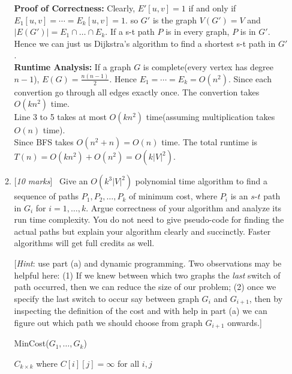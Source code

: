 \documentclass[11pt]{article}
\newcommand{\Q}[1]{\medskip\item {[{\em #1 marks\/}]}\ }
\begin{document}
\begin{enumerate}
\begin{enumerate}
\textbf{Proof of Correctness:} Clearly, $E'[u, v] = 1$ if and only if $E_1[u, v] = \cdots = E_k[u, v] = 1$.
so $G'$ is the graph $V(G') = V$ and $|E(G')| = E_1 \cap \dots \cap E_k$.
If a s-t path $P$ is in every graph, $P$ is in $G'$. Hence we can just us Dijkstra's algorithm to find a 
shortest s-t path in $G'$.\\
\textbf{Runtime Analysis:} If a graph $G$ is complete(every vertex has degree $n - 1$), $E(G) = \frac 
{n(n - 1)} {2}$. Hence $E_1 = \cdots = E_k = O(n^2)$. Since each convertion go through all edges exactly once. 
The convertion takes $O(k n^2)$ time. \\
Line 3 to 5 takes at most $O(kn^2)$ time(assuming multiplication takes $O(n)$ time). \\
Since BFS takes $O(n^2 + n) = O(n)$ time. The total runtime is 
$T(n) = O(kn^2) + O(n^2) = O(k |V|^2)$.

\newpage
	\Q{10} Give an $O(k^3|V|^2)$ polynomial time algorithm to find a sequence of paths $P_1, P_2, \ldots, P_k$ of minimum cost, where $P_i$ is an $s$-$t$ path in $G_i$ for $i=1,\ldots,k$. Argue correctness of your algorithm and analyze its run time complexity. You do not need to give pseudo-code for finding the actual paths but explain your algorithm clearly and succinctly. Faster algorithms will get full credits as well.
	
	[\emph{Hint}: use part (a) and dynamic programming. Two observations may be helpful here: (1) If we knew between which two graphs the \emph{last} switch of path occurred, then we can reduce the size of our problem; (2) once we specify the last switch to occur say between graph $G_i$ and $G_{i+1}$, then by inspecting the definition of the cost and with help in part (a) we can figure out which path we should choose from graph $G_{i+1}$ onwards.]
    
    \begin{algorithm}[h]
        \caption{MinCost($G_1, \dots, G_k$)}
        $C_{k \times k}$ where $C[i][j] = \infty$ for all $i, j$\\
    \end{algorithm}


\end{enumerate}
\end{enumerate}
\end{document}
